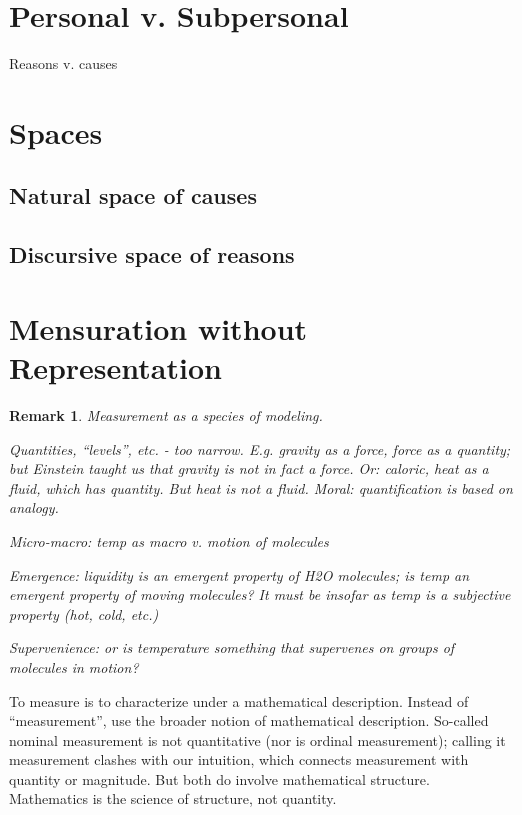 \documentclass[11pt,twoside]{article}
\newtheorem{remark}{Remark}
\begin{document}
\section{Personal v. Subpersonal}

Reasons v. causes

\section{Spaces}

\subsection{Natural space of causes}

\subsection{Discursive space of reasons}

\clearpage

\section{Mensuration without Representation}
\begin{remark}

Measurement as a species of modeling.

Quantities, ``levels'', etc. - too narrow.  E.g. gravity as a force,
force as a quantity; but Einstein taught us that gravity is not in
fact a force.  Or: caloric, heat as a fluid, which has quantity.  But
heat is not a fluid. Moral: quantification is based on analogy.


Micro-macro:  temp as macro v. motion of molecules

Emergence: liquidity is an emergent property of H2O molecules; is temp
an emergent property of moving molecules?  It must be insofar as temp
is a subjective property (hot, cold, etc.)

Supervenience: or is temperature something that supervenes on groups
of molecules in motion?

\end{remark}

To measure is to characterize under a mathematical description.
Instead of ``measurement'', use the broader notion of mathematical
description.  So-called nominal measurement is not quantitative (nor
is ordinal measurement); calling it measurement clashes with our
intuition, which connects measurement with quantity or magnitude.  But
both do involve mathematical structure.  Mathematics is the science of
structure, not quantity.
\end{document}

